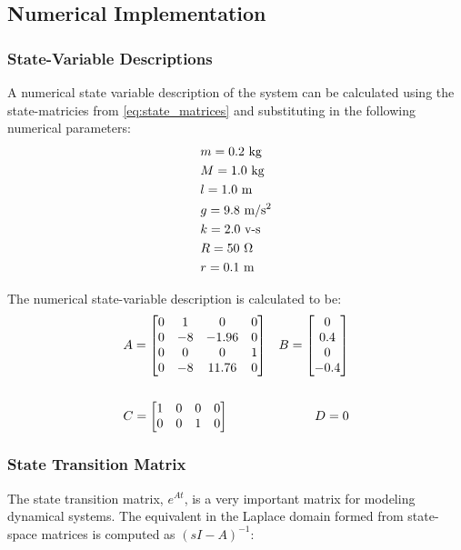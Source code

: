 \documentclass[]{article}
\begin{document}
	\subsection{Numerical Implementation}
		\subsubsection{State-Variable Descriptions}
			A numerical state variable description of the system can be calculated using the state-matricies from \eqref{eq:state_matrices} and substituting in the following numerical parameters:
			\begin{align*}
				&m = 0.2 \ \text{kg} \\
				&M = 1.0 \ \text{kg} \\
				&l = 1.0 \ \text{m} \\
				&g = 9.8 \ \text{m/s\textsuperscript{2}} \\
				&k = 2.0 \ \text{v-s} \\
				&R = 50  \ \Omega \\
				&r = 0.1 \ \text{m}
			\end{align*}
			
			The numerical state-variable description is calculated to be:
			\begin{equation}
				\begin{aligned}
					&A = \mqty[	0 & 1 	& 0 	& 0\\
								0 & -8	& -1.96 & 0 \\
								0 & 0	& 0 	& 1\\
								0 & -8	& 11.76	& 0	]
					&B = \mqty[	0\\
								0.4\\
								0\\
								-0.4] \\ && \\
					&C = \mqty[	1 & 0 & 0 & 0\\
								0 & 0 & 1 & 0]
					&D = 0
				\end{aligned}
				\label{eq:pendulum_state_matrices}
			\end{equation}
	
		\subsubsection{State Transition Matrix}
			The state transition matrix, $e^{At}$, is a very important matrix for modeling dynamical systems. The equivalent in the Laplace domain formed from state-space matrices is computed as $(sI - A)^{-1}$:
			
\end{document}
